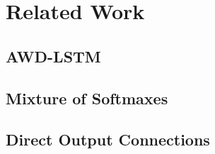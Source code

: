 \chapter{Related Work}

\section{AWD-LSTM}

\section{Mixture of Softmaxes}

\section{Direct Output Connections}
